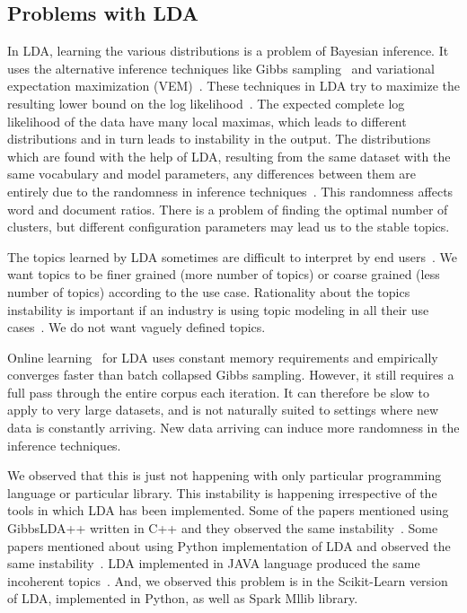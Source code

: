 \documentclass[10pt,conference]{IEEEtran}
\theoremstyle{break}
\begin{document}
\subsection{Problems with LDA}
\label{sect: problems}

\begin{compactitem}
    \item In LDA, learning the various distributions is a problem of Bayesian inference. It uses the alternative inference techniques like Gibbs sampling~\cite{wei2006lda, griffiths2004finding} and variational expectation maximization (VEM)~\cite{minka2002expectation}. These techniques in LDA try to maximize the resulting lower bound on the log likelihood~\cite{blei2003latent}. The expected complete log likelihood of the data have many local maximas, which leads to different distributions and in turn leads to instability in the output. The distributions which are found with the help of LDA, resulting from the same dataset with the same vocabulary and model parameters, any differences between them are entirely due to the randomness in inference techniques~\cite{koltcov2014latent}. This randomness affects word and document ratios. There is a problem of finding the optimal number of clusters, but different configuration parameters may lead us to the stable topics.
    \item The topics learned by LDA sometimes are difficult to interpret by end users~\cite{yang2015improving, panichella2013effectively}. We want topics to be finer grained (more number of topics) or coarse grained (less number of topics) according to the use case. Rationality about the topics instability is important if an industry is using topic modeling in all their use cases~\cite{lau2014machine, o2015analysis}. We do not want vaguely defined topics.
    \item Online learning~\cite{hoffman2010online} for LDA uses constant memory requirements and empirically converges faster than batch collapsed Gibbs sampling. However, it still requires a full pass through the entire corpus each iteration. It can therefore be slow to apply to very large datasets, and is not naturally suited to settings where new data is constantly arriving. New data arriving can induce more randomness in the inference techniques.
    \item We observed that this is just not happening with only particular programming language or particular library. This instability is happening irrespective of the tools in which LDA has been implemented. Some of the papers mentioned using GibbsLDA++ written in C++ and they observed the same instability~\cite{lukins2008source, tian2009using, guzman2014users}. Some papers mentioned about using Python implementation of LDA and observed the same instability~\cite{guzman2014users}. LDA implemented in JAVA language produced the same incoherent topics~\cite{martin2015app, hindle2011automated}. And, we observed this problem is in the Scikit-Learn version of LDA, implemented in Python, as well as Spark Mllib library.
\end{compactitem}
\end{document}
